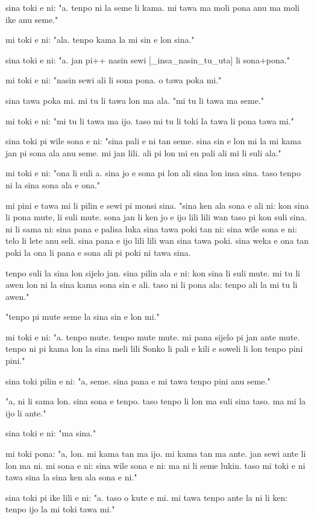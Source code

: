 \documentclass{article}
\begin{document}
sina toki e ni: "a. tenpo ni la seme li kama. mi tawa ma moli pona anu ma moli ike anu seme."

mi toki e ni: "ala. tenpo kama la mi sin e lon sina."

sina toki e ni: "a. jan pi++ nasin sewi {[}\_insa\_nasin\_tu\_uta{]} li sona+pona."

mi toki e ni: "nasin sewi ali li sona pona. o tawa poka mi."

sina tawa poka mi. mi tu li tawa lon ma ala. "mi tu li tawa ma seme."

mi toki e ni: "mi tu li tawa ma ijo. taso mi tu li toki la tawa li pona tawa mi."

sina toki pi wile sona e ni: "sina pali e ni tan seme. sina sin e lon mi la mi kama jan pi sona ala anu seme. mi jan lili. ali pi lon mi en pali ali mi li suli ala."

mi toki e ni: "ona li suli a. sina jo e sona pi lon ali sina lon insa sina. taso tenpo ni la sina sona ala e ona."

mi pini e tawa mi li pilin e sewi pi monsi sina. "sina ken ala sona e ali ni: kon sina li pona mute, li suli mute. sona jan li ken jo e ijo lili lili wan taso pi kon suli sina. ni li sama ni: sina pana e palisa luka sina tawa poki tan ni: sina wile sona e ni: telo li lete anu seli. sina pana e ijo lili lili wan sina tawa poki. sina weka e ona tan poki la ona li pana e sona ali pi poki ni tawa sina.

tenpo suli la sina lon sijelo jan. sina pilin ala e ni: kon sina li suli mute. mi tu li awen lon ni la sina kama sona sin e ali. taso ni li pona ala: tenpo ali la mi tu li awen."

"tenpo pi mute seme la sina sin e lon mi."

mi toki e ni: "a. tenpo mute. tenpo mute mute. mi pana sijelo pi jan ante mute. tenpo ni pi kama lon la sina meli lili Sonko li pali e kili e soweli li lon tenpo pini pini."

sina toki pilin e ni: "a, seme. sina pana e mi tawa tenpo pini anu seme."

"a, ni li sama lon. sina sona e tenpo. taso tenpo li lon ma suli sina taso. ma mi la ijo li ante."

sina toki e ni: "ma sina."

mi toki pona: "a, lon. mi kama tan ma ijo. mi kama tan ma ante. jan sewi ante li lon ma ni. mi sona e ni: sina wile sona e ni: ma ni li seme lukin. taso mi toki e ni tawa sina la sina ken ala sona e ni."

sina toki pi ike lili e ni: "a. taso o kute e mi. mi tawa tenpo ante la ni li ken: tenpo ijo la mi toki tawa mi."
\end{document}
